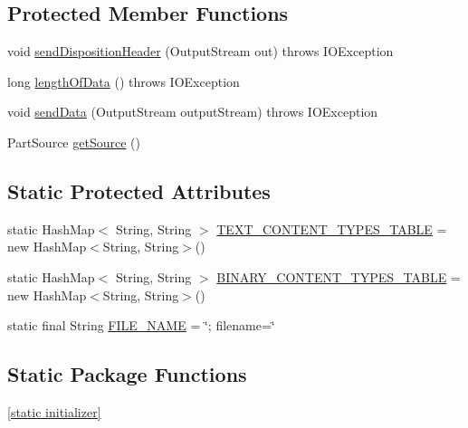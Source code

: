 \subsection*{Protected Member Functions}
\begin{DoxyCompactItemize}
\item 
void \hyperlink{classcom_1_1bluevia_1_1commons_1_1connector_1_1http_1_1multipart_1_1FilePart_ac52ebc02335ce4807ce5db983e42908b}{sendDispositionHeader} (OutputStream out)  throws IOException 
\item 
long \hyperlink{classcom_1_1bluevia_1_1commons_1_1connector_1_1http_1_1multipart_1_1FilePart_addeceb95d953faf55f7ad6640f72c17f}{lengthOfData} ()  throws IOException 
\item 
void \hyperlink{classcom_1_1bluevia_1_1commons_1_1connector_1_1http_1_1multipart_1_1FilePart_a07bc26c67e8ca2a25142234860afa036}{sendData} (OutputStream outputStream)  throws IOException 
\item 
PartSource \hyperlink{classcom_1_1bluevia_1_1commons_1_1connector_1_1http_1_1multipart_1_1FilePart_ac329bf5d92ac0a53832d45c05c575f01}{getSource} ()
\end{DoxyCompactItemize}
\subsection*{Static Protected Attributes}
\begin{DoxyCompactItemize}
\item 
static HashMap$<$ String, String $>$ \hyperlink{classcom_1_1bluevia_1_1commons_1_1connector_1_1http_1_1multipart_1_1FilePart_a9899cc3c8467b5ac76040a8f4260f46d}{TEXT\_\-CONTENT\_\-TYPES\_\-TABLE} = new HashMap$<$String, String$>$()
\item 
static HashMap$<$ String, String $>$ \hyperlink{classcom_1_1bluevia_1_1commons_1_1connector_1_1http_1_1multipart_1_1FilePart_a2f89f61e068eb660946ba7a28ad09a5b}{BINARY\_\-CONTENT\_\-TYPES\_\-TABLE} = new HashMap$<$String, String$>$()
\item 
static final String \hyperlink{classcom_1_1bluevia_1_1commons_1_1connector_1_1http_1_1multipart_1_1FilePart_a181342379932cfacadee5b1f8c0113c7}{FILE\_\-NAME} = \char`\"{}; filename=\char`\"{}
\end{DoxyCompactItemize}
\subsection*{Static Package Functions}
\begin{DoxyCompactItemize}
\item 
\hyperlink{classcom_1_1bluevia_1_1commons_1_1connector_1_1http_1_1multipart_1_1FilePart_ae87c6f588873f20d0ea80fede1994240}{\mbox{[}static initializer\mbox{]}}
\end{DoxyCompactItemize}


